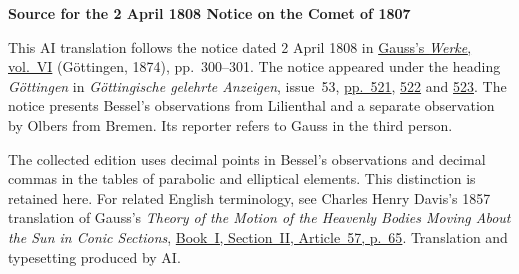 \clearpage\thispagestyle{empty}
\begin{center}\textbf{Source for the 2 April 1808 Notice on the Comet of 1807}\end{center}
\noindent This AI translation follows the notice dated 2 April 1808 in \href{https://gdz.sub.uni-goettingen.de/id/PPN236007467}{Gauss’s \textit{Werke}, vol.~VI} (Göttingen, 1874), pp.~300--301. The notice appeared under the heading \textit{Göttingen} in \textit{Göttingische gelehrte Anzeigen}, issue~53, \href{https://manifests.sub.uni-goettingen.de/iiif/image/gdz:PPN319721507_1808:00000525/full/1600,/0/default.jpg}{pp.~521}, \href{https://manifests.sub.uni-goettingen.de/iiif/image/gdz:PPN319721507_1808:00000526/full/1600,/0/default.jpg}{522} and \href{https://manifests.sub.uni-goettingen.de/iiif/image/gdz:PPN319721507_1808:00000527/full/1600,/0/default.jpg}{523}. The notice presents Bessel’s observations from Lilienthal and a separate observation by Olbers from Bremen. Its reporter refers to Gauss in the third person.
\par\medskip
The collected edition uses decimal points in Bessel’s observations and decimal commas in the tables of parabolic and elliptical elements. This distinction is retained here. For related English terminology, see Charles Henry Davis’s 1857 translation of Gauss’s \textit{Theory of the Motion of the Heavenly Bodies Moving About the Sun in Conic Sections}, \href{https://www2.karlin.mff.cuni.cz/~tuma/Aplikace21/theoryofmotionof00gausuoft.pdf#page=89}{Book~I, Section~II, Article~57, p.~65}. Translation and typesetting produced by AI.
\clearpage
